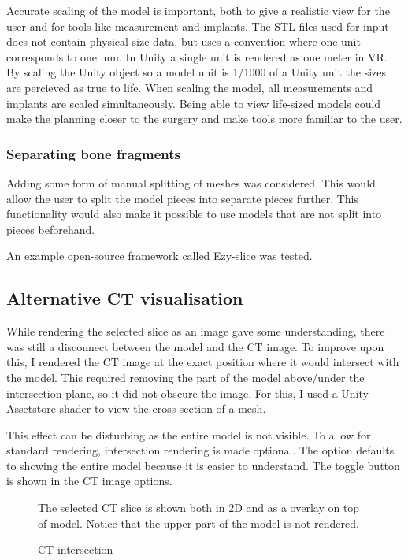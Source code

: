 \documentclass[a4paper]{report}
\begin{document}
Accurate scaling of the model is important, both to give a realistic view for the user and for tools like measurement and implants. The STL files used for input does not contain physical size data, but uses a convention where one unit corresponds to one mm. In Unity a single unit is rendered as one meter in VR. By scaling the Unity object so a model unit is 1/1000 of a Unity unit the sizes are percieved as true to life. When scaling the model, all measurements and implants are scaled simultaneously.
Being able to view life-sized models could make the planning closer to the surgery and make tools more familiar to the user.

\subsubsection{Separating bone fragments}
Adding some form of manual splitting of meshes was considered. This would allow the user to split the model pieces into separate pieces further. This functionality would also make it possible to use models that are not split into pieces beforehand.

An example open-source framework called Ezy-slice\cite{arayan_davidarayanezy-slice_2022} was tested.

\subsection{Alternative CT visualisation}
While rendering the selected slice as an image gave some understanding, there was still a disconnect between the model and the CT image. To improve upon this, I rendered the CT image at the exact position where it would intersect with the model.
This required removing the part of the model above/under the intersection plane, so it did not obscure the image. For this, I used a Unity Assetstore shader to view the cross-section of a mesh\cite{aldandarawy_unity_2019}.

This effect can be disturbing as the entire model is not visible. To allow for standard rendering, intersection rendering is made optional. The option defaults to showing the entire model because it is easier to understand.
The toggle button is shown in the CT image options.

\begin{figure}[h!]
    \centering
	\hfill
  \caption{CT intersection}
  \small
  The selected CT slice is shown both in 2D and as a overlay on top of model. Notice that the upper part of the model is not rendered.
\end{figure}
\end{document}
